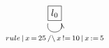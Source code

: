 $\xymatrix{
   \fbox{$l_0$} \ar@(dl,dr)[]_{rule\,|\,x\,=\,25\,/\backslash\,x\,!=\,10\,|\,x\,:=\,5}
}$
